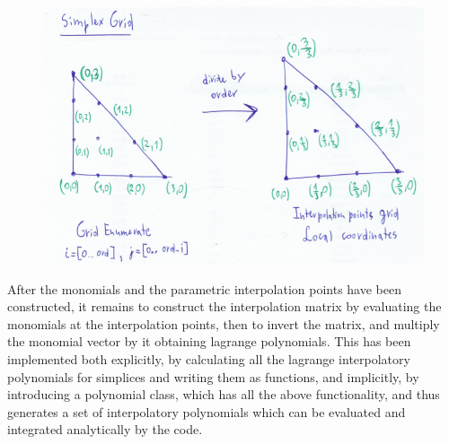 \begin{figure}[hp]
    \centering
    \includegraphics[scale=0.5]{doc-pics/pic-simplex-grid.png}
\end{figure}

\noindent
After the monomials and the parametric interpolation points have been constructed, it remains to construct the interpolation matrix by evaluating the monomials at the interpolation points, then to invert the matrix, and multiply the monomial vector by it obtaining lagrange polynomials. This has been implemented both explicitly, by calculating all the lagrange interpolatory polynomials for simplices and writing them as functions, and implicitly, by introducing a polynomial class, which has all the above functionality, and thus generates a set of interpolatory polynomials which can be evaluated and integrated analytically by the code.